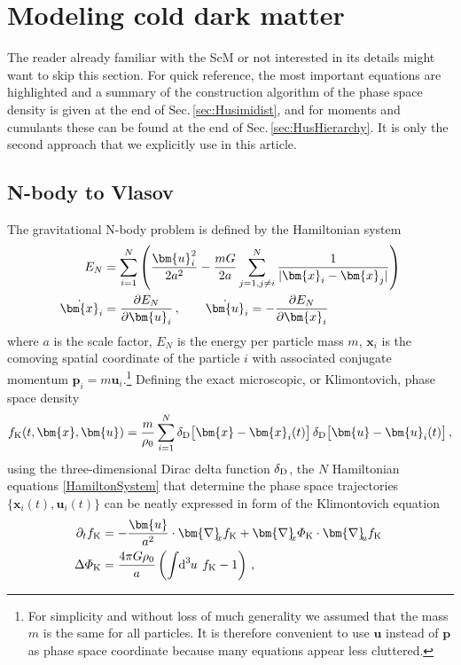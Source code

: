 \documentclass[twocolumn, nofootinbib, showpacs, superscriptaddress]{revtex4-1}
\newcommand{\vol}[2]{\hspace{-0.8mm}\mbox{$\text{d}^{\hspace{-0.0mm}#1}$}\hspace{-0.2mm}#2\hspace{0.8mm}\ }
\renewcommand{\v}[1]{\bm{#1} }
\newcommand{\vx}[0]{\bm{x} }
\newcommand{\vu}[0]{\bm{u} }
\newcommand{\vnabla}[0]{\bm{\nabla} }
\begin{document}
\section{Modeling cold dark matter}
\label{sec:PS-CDM}
The reader already familiar with the ScM or not interested in its details might want to skip this section. 
For quick reference, the most important equations are highlighted and a summary of the construction algorithm of the phase space density is given at the end of Sec.\,\ref{sec:Husimidist}, and for moments and cumulants these can be found at the end of Sec.\,\ref{sec:HusHierarchy}. It is only the second approach that we explicitly use in this article.

\subsection{N-body to Vlasov}
The gravitational N-body problem is defined by the Hamiltonian system 
\begin{align} 
E_N &= \sum_{i=1}^N\left(\frac{\vu_i^2}{2a^2}- \frac{m G}{2 a }\sum_{j=1, j\neq i}^N\frac{1}{|\vx_i - \vx_j |} \right) \notag \\
\dot \vx_i &= \frac{\partial E_N}{\partial \vu_i}\,,\qquad \dot{\vu}_i = - \frac{\partial E_N}{\partial \v{x}_i} \label{HamiltonSystem}
\end{align}
where $a$ is the scale factor, $E_N$ is the energy per particle mass $m$,  $\vx_i$ is the comoving spatial coordinate of the particle $i$ with associated conjugate momentum $\v{p}_i= m \vu_i$.\footnote{For simplicity and without loss of much generality we assumed that the mass $m$  is the same for all particles. It is therefore convenient to use $\vu$ instead of $\v{p}$ as phase space coordinate because many equations appear less cluttered.} 
Defining the exact microscopic, or Klimontovich, phase space density
\begin{align} \label{Klimonotovichf}
f_{\rm K} (t,\vx,\vu) = \frac{m}{\rho_0}\sum_{i=1}^N \delta_{\rm D}\big[\vx-\vx_i(t)\big]\,\delta_{\rm D}\big[\vu-\vu_i(t)\big] \,,
\end{align}
using the three-dimensional Dirac delta function $\delta_{\rm D}$, the $N$ Hamiltonian equations \eqref{HamiltonSystem} that determine the phase space trajectories $\{\vx_i(t),  \v{u}_i(t)\}$  
can be neatly expressed in form of  the Klimontovich equation \cite{Klimontovich67} 
\begin{subequations}
\label{KlimoPoissonEq}
\begin{align}
\label{KlimoEq}
\partial_t f_{\rm K}&=   -\frac{\vu}{a^2}\cdot \vnabla_{\! \!  x} f_{\rm K} +  \vnabla_{\! \!  x} \varPhi_{\rm K} \cdot \vnabla_{\! \!  u} f_{\rm K} \ \\
\Delta \varPhi_{\rm K} &= \frac{4\pi G\rho_0}{a} \left(\int \vol{3}{u} \!f_{\rm K} - 1 \right) \,,\label{PoissonEq}
\end{align}
\end{subequations}
\end{document}
